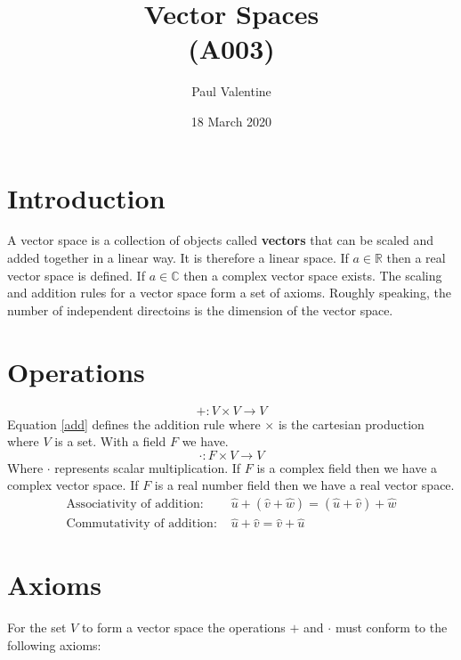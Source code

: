 \documentclass[a4paper]{article}
\title{\textbf{Vector Spaces}\\(A003)}
\author{Paul Valentine}
\date{18 March 2020}
\begin{document}
\maketitle
\section{Introduction}
A vector space is a collection of objects called \textbf{vectors} that can be scaled and added together in a linear way. It is therefore a linear space. If $a \in \mathbb{R}$ then a real vector space is defined. If $a \in \mathbb{C}$ then a complex vector space exists. The scaling and addition rules for a vector space form a set of axioms. Roughly speaking, the number of independent directoins is the dimension of the vector space.
\section{Operations}
\label{operations}
\begin{equation}
  \label{add}
  +:V \times V \to V
\end{equation}
Equation \ref{add} defines the addition rule where $\times$ is the cartesian production\cite{A002} where $V$ is a set. With a field $F$ we have.
\begin{equation}
  \cdot : F \times V \to V
\end{equation}
Where $\cdot$ represents scalar multiplication. If $F$ is a complex field then we have a complex vector space. If $F$ is a real number field then we have a real vector space.
\begin{align}
  \text{Associativity of addition: } &\hat{u}+(\hat{v}+\hat{w}) = (\hat{u}+\hat{v})+\hat{w}\\
  \text{Commutativity of addition: }&\hat{u}+\hat{v} = \hat{v}+\hat{u}
\end{align}
\section{Axioms}
For the set $V$ to form a vector space the operations $+$ and $\cdot$ must conform to the following axioms:


\end{document}
